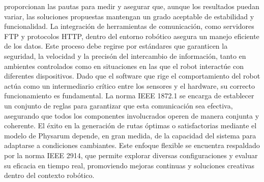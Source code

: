         proporcionan las pautas para medir y asegurar que, aunque los resultados puedan variar, las soluciones propuestas 
        mantengan un grado aceptable de estabilidad y funcionalidad.
    \vskip 0.5cm
    La integraci\'on de herramientas de comunicaci\'on, como servidores FTP y protocolos HTTP, dentro del entorno 
        rob\'otico asegura un manejo eficiente de los datos. Este proceso debe regirse por est\'andares que garanticen 
        la seguridad, la velocidad y la precis\'on del intercambio de informaci\'on, tanto en ambientes controlados como 
        en situaciones en las que el robot interact\'ue con diferentes dispositivos.
    \vskip 0.5cm
    Dado que el software que rige el comportamiento del robot act\'ua como un intermediario cr\'itico entre los sensores 
        y el hardware, su correcto funcionamiento es fundamental. La norma IEEE 1872.1 se encarga de establecer 
        un conjunto de reglas para garantizar que esta comunicaci\'on sea efectiva, asegurando que todos los componentes 
        involucrados operen de manera conjunta y coherente.
    \vskip 0.5cm
    El \'exito en la generaci\'on de rutas \'optimas o satisfactorias mediante el modelo de Physarum depende, en gran medida, 
        de la capacidad del sistema para adaptarse a condiciones cambiantes. Este enfoque flexible se encuentra respaldado 
        por la norma IEEE 2914, que permite explorar diversas configuraciones y evaluar su eficacia en tiempo real, 
        promoviendo mejoras continuas y soluciones creativas dentro del contexto rob\'otico.